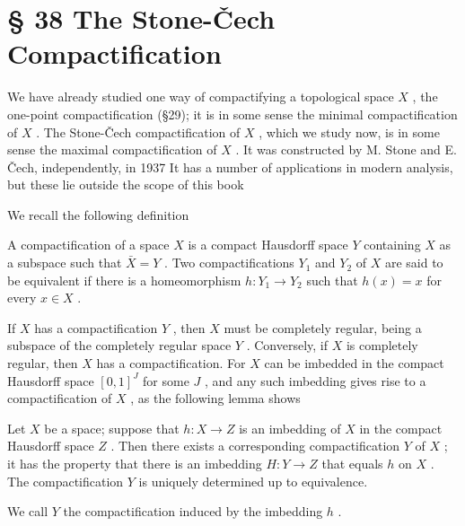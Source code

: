 \section*{§ 38 The Stone-Čech Compactification}

We have already studied one way of compactifying a topological space \(X\) , the one-point compactification (§29); it is in some sense the minimal compactification of \(X\) . The Stone-Čech compactification of \(X\) , which we study now, is in some sense the maximal compactification of \(X\) . It was constructed by M. Stone and E. Čech, independently, in 1937 It has a number of applications in modern analysis, but these lie outside the scope of this book

We recall the following definition

\begin{definition} A compactification of a space \(X\) is a compact Hausdorff space \(Y\) containing \(X\) as a subspace such that \(\bar{X} = Y\) . Two compactifications \({Y}_{1}\) and \({Y}_{2}\) of \(X\) are said to be equivalent if there is a homeomorphism \(h : {Y}_{1} \rightarrow  {Y}_{2}\) such that \(h\left( x\right)  = x\) for every \(x \in  X\) .
\end{definition}

If \(X\) has a compactification \(Y\) , then \(X\) must be completely regular, being a subspace of the completely regular space \(Y\) . Conversely, if \(X\) is completely regular, then \(X\) has a compactification. For \(X\) can be imbedded in the compact Hausdorff space \({\left\lbrack  0,1\right\rbrack  }^{J}\) for some \(J\) , and any such imbedding gives rise to a compactification of \(X\) , as the following lemma shows

\begin{lemma} Let \(X\) be a space; suppose that \(h : X \rightarrow  Z\) is an imbedding of \(X\) in the compact Hausdorff space \(Z\) . Then there exists a corresponding compactification \(Y\) of \(X\) ; it has the property that there is an imbedding \(H : Y \rightarrow  Z\) that equals \(h\) on \(X\) . The compactification \(Y\) is uniquely determined up to equivalence.
\end{lemma}

We call \(Y\) the compactification induced by the imbedding \(h\) .

